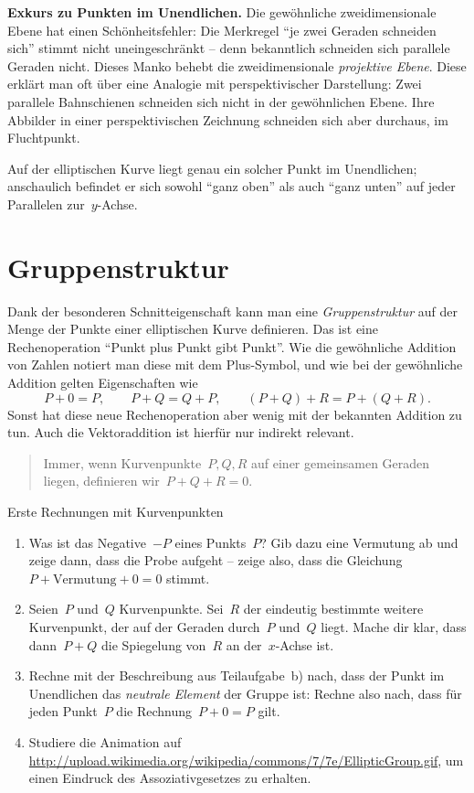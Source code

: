 \documentclass{../zirkelblatt}
\newcommand{\head}[1]{\section*{\rmfamily #1}}%
\begin{document}
\textbf{Exkurs zu Punkten im Unendlichen.} Die gewöhnliche zweidimensionale
Ebene hat einen Schönheitsfehler: Die Merkregel "`je zwei Geraden schneiden
sich"' stimmt nicht uneingeschränkt -- denn bekanntlich schneiden sich
parallele Geraden nicht. Dieses Manko behebt die zweidimensionale
\emph{projektive Ebene}. Diese erklärt man oft über eine Analogie mit
perspektivischer Darstellung: Zwei parallele Bahnschienen schneiden sich nicht
in der gewöhnlichen Ebene. Ihre Abbilder in einer perspektivischen Zeichnung
schneiden sich aber durchaus, im Fluchtpunkt.

Auf der elliptischen Kurve liegt genau ein solcher Punkt im Unendlichen;
anschaulich befindet er sich sowohl "`ganz oben"' als auch "`ganz unten"' auf
jeder Parallelen zur~$y$-Achse.


\head{Gruppenstruktur}

Dank der besonderen Schnitteigenschaft kann man eine
\emph{Gruppenstruktur} auf der Menge der Punkte einer elliptischen Kurve definieren.
Das ist eine Rechenoperation "`Punkt plus Punkt gibt Punkt"'. Wie die
gewöhnliche Addition von Zahlen notiert man diese mit dem Plus-Symbol, und wie
bei der gewöhnliche Addition gelten Eigenschaften wie
\[ P + 0 = P, \qquad P + Q = Q + P, \qquad (P + Q) + R = P + (Q + R). \]
Sonst hat diese neue Rechenoperation aber wenig mit der bekannten Addition zu
tun. Auch die Vektoraddition ist hierfür nur indirekt relevant.

\begin{quote}Immer, wenn Kurvenpunkte~$P, Q, R$ auf einer gemeinsamen Geraden
liegen, definieren wir~$P + Q + R = 0$.
\end{quote}

\begin{aufgabeShaded}{Erste Rechnungen mit Kurvenpunkten}
\begin{enumerate}
\item Was ist das Negative~$-P$ eines Punkts~$P$? Gib dazu eine Vermutung ab
und zeige dann, dass die Probe aufgeht -- zeige also, dass die Gleichung~$P +
\text{Vermutung} + 0 = 0$ stimmt.
\item Seien~$P$ und~$Q$ Kurvenpunkte. Sei~$R$ der eindeutig bestimmte weitere
Kurvenpunkt, der auf der Geraden durch~$P$ und~$Q$ liegt. Mache dir klar, dass
dann~$P + Q$ die Spiegelung von~$R$ an der~$x$-Achse ist.
\item Rechne mit der Beschreibung aus Teilaufgabe~b) nach, dass der Punkt im
Unendlichen das \emph{neutrale Element} der Gruppe ist: Rechne also nach, dass
für jeden Punkt~$P$ die Rechnung~$P + 0 = P$ gilt.
\item Studiere die Animation auf
\url{http://upload.wikimedia.org/wikipedia/commons/7/7e/EllipticGroup.gif}, um
einen Eindruck des Assoziativgesetzes zu erhalten.
\end{enumerate}
\end{aufgabeShaded}
\end{document}
